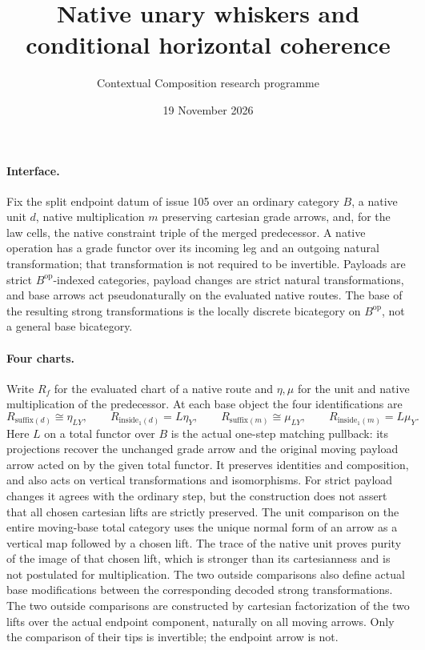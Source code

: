 \documentclass[11pt]{article}
\title{Native unary whiskers and conditional horizontal coherence}
\author{Contextual Composition research programme}
\date{19 November 2026}
\begin{document}
\maketitle
\paragraph{Interface.} Fix the split endpoint datum of issue 105 over an ordinary category $B$,
a native unit $d$, native multiplication $m$ preserving cartesian grade arrows, and,
for the law cells, the native constraint triple of the merged predecessor. A native
operation has a grade functor over its incoming leg and an outgoing natural
transformation; that transformation is not required to be invertible. Payloads
are strict $B^{\mathrm{op}}$-indexed categories, payload changes are strict natural
transformations, and base arrows act pseudonaturally on the evaluated native
routes. The base of the resulting strong transformations is the locally discrete
bicategory on $B^{\mathrm{op}}$, not a general base bicategory.
\paragraph{Four charts.} Write $R_f$ for the evaluated chart of a native route and
$\eta,\mu$ for the unit and native multiplication of the predecessor. At each base
object the four identifications are
\[
 R_{\mathrm{suffix}(d)}\cong\eta_{LY},\qquad R_{\mathrm{inside}_1(d)}=L\eta_Y,
 \qquad R_{\mathrm{suffix}(m)}\cong\mu_{LY},\qquad
 R_{\mathrm{inside}_1(m)}=L\mu_Y.
\]
Here $L$ on a total functor over $B$ is the actual one-step matching pullback:
its projections recover the unchanged grade arrow and the original moving
payload arrow acted on by the given total functor. It preserves identities and
composition, and also acts on vertical transformations and isomorphisms.
For strict payload changes it agrees with the ordinary step, but the construction
does not assert that all chosen cartesian lifts are strictly preserved.
The unit comparison on the entire moving-base total category uses the unique
normal form of an arrow as a vertical map followed by a chosen lift. The trace
of the native unit proves purity of the image of that chosen lift, which is
stronger than its cartesianness and is not postulated for multiplication.
The two outside comparisons also define actual base modifications between the corresponding decoded strong transformations. The two outside comparisons are constructed by cartesian factorization of the
two lifts over the actual endpoint component, naturally on all moving arrows.
Only the comparison of their tips is invertible; the endpoint arrow is not.
\end{document}
